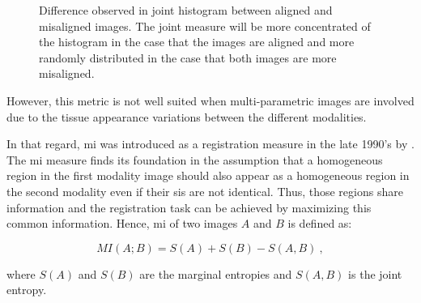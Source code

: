 \begin{figure}
\centering
	\hspace*{\fill}
	 \hfill
	\hspace*{\fill}
	\caption{Difference observed in joint histogram between aligned and misaligned images. The joint measure will be more concentrated of the histogram in the case that the images are aligned and more randomly distributed in the case that both images are more misaligned.}
	\label{fig:jointhisto}
\end{figure}

However, this metric is not well suited when multi-parametric images are involved due to the tissue appearance variations between the different modalities.

In that regard, \ac{mi} was introduced as a registration measure in the late 1990's by \cite{Pluim2003}. The \ac{mi} measure finds its foundation in the assumption that a homogeneous region in the first modality image should also appear as a homogeneous region in the second modality even if their \acp{si} are not identical. Thus, those regions share information and the registration task can be achieved by maximizing this common information. Hence, \Ac{mi} of two images $A$ and $B$ is defined as:

\begin{equation}
	MI(A;B) = S(A) + S(B) - S(A,B) \ ,
	\label{eq:midef}
\end{equation}

\noindent where $S(A)$ and $S(B)$ are the marginal entropies and $S(A,B)$ is the joint entropy.

